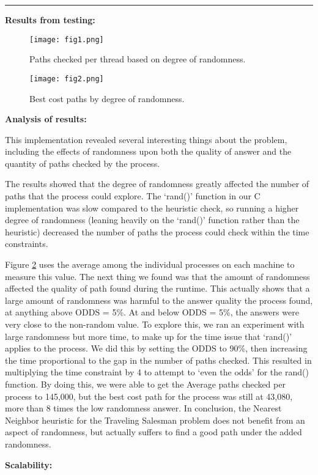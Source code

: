 \documentclass[letter, 12pt]{article}
\newenvironment{question}[1]{%
    \vspace{.2in}%
        \noindent{\bf #1}%
    \vspace{0.3em} \hrule \vspace{.1in}%
}{}
\begin{document}
\begin{question}{\large Traveling Salesperson Problem}
\textbf{Results from testing:}
\begin{figure}[H]
  \centering
  \texttt{[image: fig1.png]}
  \caption{Paths checked per thread based on degree of randomness.}
  \label{fig:fig1}
\end{figure}
\begin{figure}[H]
  \centering
  \texttt{[image: fig2.png]}
  \caption{Best cost paths by degree of randomness.}
  \label{fig:fig2}
\end{figure}

\newpage
\textbf{Analysis of results:}

This implementation revealed several interesting things about the problem, including the effects of randomness upon both the quality of answer and the quantity of paths checked by the process.

The results showed that the degree of randomness greatly affected the number of paths that the process could explore. The ‘rand()’ function in our C implementation was slow compared to the heuristic check, so running a higher degree of randomness (leaning heavily on the ‘rand()’ function rather than the heuristic) decreased the number of paths the process could check within the time constraints. 

Figure \ref{fig:fig2} uses the average among the individual processes on each machine to measure this value. The next thing we found was that the amount of randomness affected the quality of path found during the runtime. This actually shows that a large amount of randomness was harmful to the answer quality the process found, at anything above ODDS = 5\%. At and below ODDS = 5\%, the answers were very close to the non-random value. To explore this, we ran an experiment with large randomness but more time, to make up for the time issue that ‘rand()’ applies to the process. We did this by setting the ODDS to 90\%, then increasing the time proportional to the gap in the number of paths checked. This resulted in multiplying the time constraint by 4 to attempt to ‘even the odds’ for the rand() function. By doing this, we were able to get the Average paths checked per process to 145,000, but the best cost path for the process was still at 43,080, more than 8 times the low randomness answer. In conclusion, the Nearest Neighbor heuristic for the Traveling Salesman problem does not benefit from an aspect of randomness, but actually suffers to find a good path under the added randomness.

\textbf{Scalability:}


\end{question}
\end{document}
